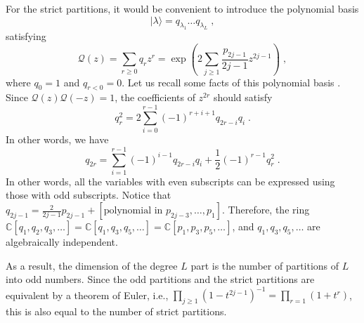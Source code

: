 \documentclass[11pt]{article}
\numberwithin{equation}{section}
\numberwithin{figure}{section}
\numberwithin{table}{section}
\begin{document}
For the strict partitions, it would be convenient to introduce the polynomial basis
\begin{equation}
	|\lambda\rangle=q_{\lambda_1}\dots q_{\lambda_L}\;,
\end{equation}
satisfying
\begin{equation}
	\mathcal{Q}(z)=\sum_{r\geq0}q_rz^r=\exp\left(2\sum_{j\geq1}\frac{p_{2j-1}}{2j-1}z^{2j-1}\right)\;,
\end{equation}
where $q_0=1$ and $q_{r<0}=0$. Let us recall some facts of this polynomial basis \cite{macdonald1998symmetric}. Since $\mathcal{Q}(z)\mathcal{Q}(-z)=1$, the coefficients of $z^{2r}$ should satisfy
\begin{equation}
	q_r^2=2\sum_{i=0}^{r-1}(-1)^{r+i+1}q_{2r-i}q_i\;.
\end{equation}
In other words, we have
\begin{equation}
	q_{2r}=\sum_{i=1}^{r-1}(-1)^{i-1}q_{2r-i}q_i+\frac{1}{2}(-1)^{r-1}q_r^2\;.
\end{equation}
In other words, all the variables with even subscripts can be expressed using those with odd subscripts. Notice that $q_{2j-1}=\frac{2}{2j-1}p_{2j-1}+[\text{polynomial in }p_{2j-3},\dots,p_1]$. Therefore, the ring $\mathbb{C}[q_1,q_2,q_3,\dots]=\mathbb{C}[q_1,q_3,q_5,\dots]=\mathbb{C}[p_1,p_3,p_5,\dots]$, and $q_1,q_3,q_5,\dots$ are algebraically independent.

As a result, the dimension of the degree $L$ part is the number of partitions of $L$ into odd numbers. Since the odd partitions and the strict partitions are equivalent by a theorem of Euler, i.e., $\prod\limits_{j\geq1}\left(1-t^{2j-1}\right)^{-1}=\prod\limits_{r=1}(1+t^r)$, this is also equal to the number of strict partitions.
\end{document}
